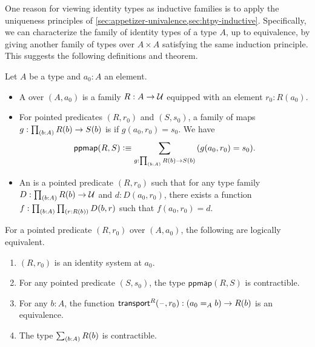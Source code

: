 
\mentalpause

One reason for viewing identity types as inductive families is to apply the uniqueness principles of \cref{sec:appetizer-univalence,sec:htpy-inductive}.
Specifically, we can characterize the family of identity types of a type $A$, up to equivalence, by giving another family of types over $A\times A$ satisfying the same induction principle.
This suggests the following definitions and theorem.

%
%

\begin{defn}\label{defn:identity-systems}
  Let $A$ be a type and $a_0:A$ an element.
  \begin{itemize}
  \item A 
    over $(A,a_0)$ is a family $R:A\to\mathcal{U}$ equipped with an element $r_0:R(a_0)$.
  \item For pointed predicates $(R,r_0)$ and $(S,s_0)$, a family of maps $g:\prd{b:A} R(b) \to S(b)$ is  if $g(a_0, r_0)=s_0$.
    We have
    \[ \mathsf{ppmap}(R,S) \defeq \sm{g:\prd{b:A} R(b) \to S(b)} (g(a_0, r_0)=s_0).\]
  \item An 
    is a pointed predicate $(R,r_0)$ such that for any type family $D:\prd{b:A} R(b) \to \type$ and $d:D(a_0,r_0)$, there exists a function $f:\prd{b:A}{r:R(b)} D(b,r)$ such that $f(a_0,r_0)=d$.
\end{itemize}
\end{defn}

\begin{thm}\label{thm:identity-systems}
  For a pointed predicate $(R,r_0)$ over $(A,a_0)$, the following are logically equivalent.
  \begin{enumerate}
  \item $(R,r_0)$ is an identity system at $a_0$.\label{item:identity-systems1}
  \item For any pointed predicate $(S,s_0)$, the type $\mathsf{ppmap}(R,S)$ is contractible.\label{item:identity-systems2}
  \item For any $b:A$, the function $\mathsf{transport}^{R}(\mathord{\hspace{1pt}\text{--}\hspace{1pt}},r_0) : (a_0 =_A b) \to R(b)$ is an equivalence.\label{item:identity-systems3}
  \item The type $\sm{b:A} R(b)$ is contractible.\label{item:identity-systems4}
  \end{enumerate}
\end{thm}

